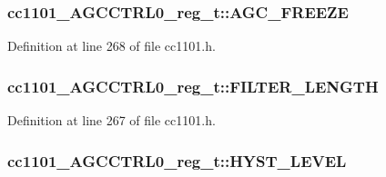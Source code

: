 \subsubsection[{\texorpdfstring{A\+G\+C\+\_\+\+F\+R\+E\+E\+ZE}{AGC_FREEZE}}]{ cc1101\+\_\+\+A\+G\+C\+C\+T\+R\+L0\+\_\+reg\+\_\+t\+::\+A\+G\+C\+\_\+\+F\+R\+E\+E\+ZE}\hypertarget{structcc1101___a_g_c_c_t_r_l0__reg__t_a0f3d99b89d3cf2b77a6e2d64759ad100}{}\label{structcc1101___a_g_c_c_t_r_l0__reg__t_a0f3d99b89d3cf2b77a6e2d64759ad100}


Definition at line 268 of file cc1101.\+h.

\subsubsection[{\texorpdfstring{F\+I\+L\+T\+E\+R\+\_\+\+L\+E\+N\+G\+TH}{FILTER_LENGTH}}]{ cc1101\+\_\+\+A\+G\+C\+C\+T\+R\+L0\+\_\+reg\+\_\+t\+::\+F\+I\+L\+T\+E\+R\+\_\+\+L\+E\+N\+G\+TH}\hypertarget{structcc1101___a_g_c_c_t_r_l0__reg__t_a62ff3eb497a99178ece5143ca102e6f5}{}\label{structcc1101___a_g_c_c_t_r_l0__reg__t_a62ff3eb497a99178ece5143ca102e6f5}


Definition at line 267 of file cc1101.\+h.

\subsubsection[{\texorpdfstring{H\+Y\+S\+T\+\_\+\+L\+E\+V\+EL}{HYST_LEVEL}}]{ cc1101\+\_\+\+A\+G\+C\+C\+T\+R\+L0\+\_\+reg\+\_\+t\+::\+H\+Y\+S\+T\+\_\+\+L\+E\+V\+EL}\hypertarget{structcc1101___a_g_c_c_t_r_l0__reg__t_a61f35d185961739d968ec87d00583a93}{}\label{structcc1101___a_g_c_c_t_r_l0__reg__t_a61f35d185961739d968ec87d00583a93}


